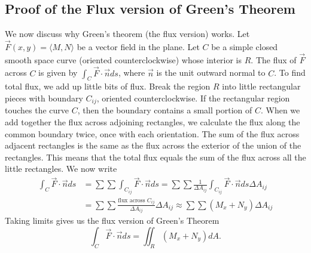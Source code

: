 \subsection{Proof of the Flux version of Green's Theorem}
We now discuss why Green's theorem (the flux version) works. Let {$
  \vec F(x,y) = \langle M,N\rangle$} be a vector field in the plane. Let {$ C $} be
a simple closed smooth space curve (oriented counterclockwise) whose
interior is {$ R $}. The flux of {$\vec F$} across {$C$} is given by
{$\int_C\vec F\cdot\vec n ds$}, where {$\vec n$} is the unit outward normal
to {$C$}. To find total flux, we add up little bits of flux. Break the
region {$R$} into little rectangular pieces with boundary {$C_{ij}$},
oriented counterclockwise. If the rectangular region touches the curve
{$C$}, then the boundary contains a small portion of {$C$}.  When we
add together the flux across adjoining rectangles, we calculate the
flux along the common boundary twice, once with each orientation. The
sum of the flux across adjacent rectangles is the same as the flux
across the exterior of the union of the rectangles. This means that
the total flux equals the sum of the flux across all the little
rectangles. We now write
\begin{align*}
  \int_C\vec F\cdot \vec n ds  
  &= \sum\sum\int_{C_{ij}}\vec F\cdot \vec n ds 
  = \sum\sum\frac{1}{\Delta A_{ij}}\int_{C_{ij}}\vec F\cdot \vec n ds \Delta A_{ij}\\
  &= \sum\sum \frac{\text{flux across }C_{ij}}{\Delta A_{ij}}  \Delta A_{ij}
  \approx \sum\sum (M_x+N_y) \Delta A_{ij}
\end{align*}
 Taking limits gives us the flux version of Green's Theorem $$\int_C\vec
F\cdot \vec n ds =\iint_R \left(M_x+N_y\right) dA.$$











